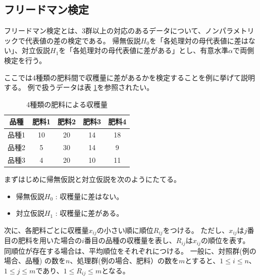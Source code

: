 \documentclass[titlepage,12pt]{jreport}
\begin{document}
\subsection{フリードマン検定\label{sub:friedman}}
フリードマン検定とは、3群以上の対応のあるデータについて、ノンパラメトリックで代表値の差の検定である。 帰無仮説$H_{0}$を「各処理対の母代表値に差はない」、対立仮説$H_{1}$を「各処理対の母代表値に差がある」とし、有意水準$\alpha$で両側検定を行う。

ここでは4種類の肥料間で収穫量に差があるかを検定することを例に挙げて説明する。 例で扱うデータは表 \ref{tab:friedman}を参照されたい。

\begin{table}[btp]
	\begin{center}
		\caption{4種類の肥料による収穫量}
		\begin{tabular}{|c||c|c|c|c|} \hline
			品種 & 肥料1 & 肥料2 & 肥料3 & 肥料4  \\ \hline \hline
			品種1 & 10 & 20 & 14 & 18 \\ \hline
			品種2 & 5 & 30 & 14 & 9 \\ \hline
			品種3 & 4 & 20 & 10 & 11 \\ \hline 
		\end{tabular}
		\label{tab:friedman}
	\end{center}
\end{table}

まずはじめに帰無仮説と対立仮説を次のようにたてる。
\begin{itemize}
	\item 帰無仮説$H_{0}$ : 収穫量に差はない。
	\item 対立仮説$H_{1}$ : 収穫量に差がある。
\end{itemize}

次に、各肥料ごとに収穫量$x_{ij}$の小さい順に順位$R_{ij}$をつける。 ただし、$x_{ij}$は$j$番目の肥料を用いた場合の$i$番目の品種の収穫量を表し、$R_{ij}$は$x_{ij}$の順位を表す。 同順位が存在する場合は、平均順位をそれぞれにつける。 一般に、対照群(例の場合、品種) の数を$n$、処理群(例の場合、肥料）の数を$m$とすると、$1 \leq i \leq n$、$1 \leq j \leq m$であり、$1 \leq R_{ij} \leq m$となる。 
\end{document}
